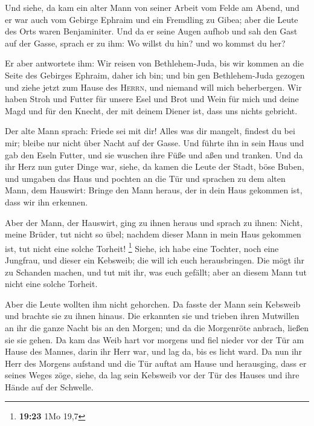  Und siehe, da kam ein alter Mann von seiner Arbeit vom
Felde am Abend, und er war auch vom Gebirge Ephraim und ein Fremdling zu
Gibea; aber die Leute des Orts waren Benjaminiter.  Und
da er seine Augen aufhob und sah den Gast auf der Gasse, sprach er zu
ihm: Wo willst du hin? und wo kommst du her?

 Er aber antwortete ihm: Wir reisen von Bethlehem-Juda,
bis wir kommen an die Seite des Gebirges Ephraim, daher ich bin; und bin
gen Bethlehem-Juda gezogen und ziehe jetzt zum Hause des \textsc{Herrn},
und niemand will mich beherbergen.  Wir haben Stroh und
Futter für unsere Esel und Brot und Wein für mich und deine Magd und für
den Knecht, der mit deinem Diener ist, dass uns nichts gebricht.

 Der alte Mann sprach: Friede sei mit dir! Alles was dir
mangelt, findest du bei mir; bleibe nur nicht über Nacht auf der Gasse.
 Und führte ihn in sein Haus und gab den Eseln Futter,
und sie wuschen ihre Füße und aßen und tranken.  Und da
ihr Herz nun guter Dinge war, siehe, da kamen die Leute der Stadt, böse
Buben, und umgaben das Haus und pochten an die Tür und sprachen zu dem
alten Mann, dem Hauswirt: Bringe den Mann heraus, der in dein Haus
gekommen ist, dass wir ihn erkennen.

 Aber der Mann, der Hauswirt, ging zu ihnen heraus und
sprach zu ihnen: Nicht, meine Brüder, tut nicht so übel; nachdem dieser
Mann in mein Haus gekommen ist, tut nicht eine solche Torheit!
\footnote{\textbf{19:23} 1Mo 19,7}  Siehe, ich habe eine
Tochter, noch eine Jungfrau, und dieser ein Kebsweib; die will ich euch
herausbringen. Die mögt ihr zu Schanden machen, und tut mit ihr, was
euch gefällt; aber an diesem Mann tut nicht eine solche Torheit.

 Aber die Leute wollten ihm nicht gehorchen. Da fasste
der Mann sein Kebsweib und brachte sie zu ihnen hinaus. Die erkannten
sie und trieben ihren Mutwillen an ihr die ganze Nacht bis an den
Morgen; und da die Morgenröte anbrach, ließen sie sie gehen.
 Da kam das Weib hart vor morgens und fiel nieder vor der
Tür am Hause des Mannes, darin ihr Herr war, und lag da, bis es licht
ward.  Da nun ihr Herr des Morgens aufstand und die Tür
auftat am Hause und herausging, dass er seines Weges zöge, siehe, da lag
sein Kebsweib vor der Tür des Hauses und ihre Hände auf der Schwelle.

